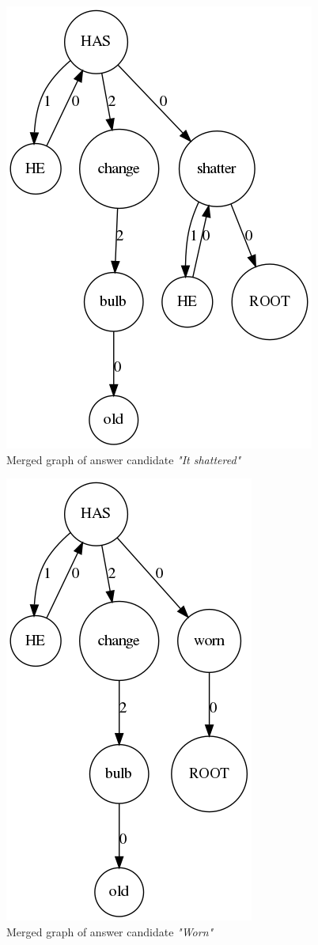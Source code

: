 \begin{figure}
	\centering
	\includegraphics[scale=0.3]{figures/comp}
	\caption{Merged graph of answer candidate \textit{"It shattered"}}
	\label{fig:merge1}
\end{figure}

\begin{figure}
	\centering
	\includegraphics[scale=0.3]{figures/comp2}
	\caption{Merged graph of answer candidate \textit{"Worn"}}
	\label{fig:merge2}
\end{figure}

